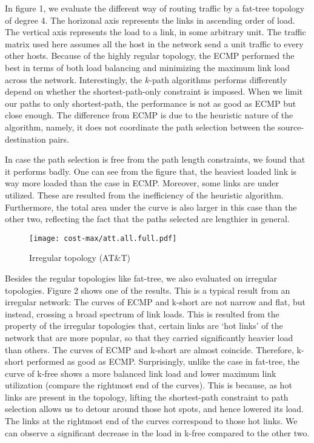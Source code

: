 \documentclass[conference]{IEEEtran}
\begin{document}
In figure 1, we evaluate the different way of routing traffic by a fat-tree
topology of degree 4. The horizonal axis represents the links in ascending
order of load. The vertical axis represents the load to a link, in some
arbitrary unit. The traffic matrix used here assumes all the host in the
network send a unit traffic to every other hosts. Because of the highly regular
topology, the ECMP performed the best in terms of both load balancing and
minimizing the maximum link load across the network. Interestingly, the
$k$-path algorithms performs differently depend on whether the
shortest-path-only constraint is imposed. When we limit our paths to only
shortest-path, the performance is not as good as ECMP but close enough. The
difference from ECMP is due to the heuristic nature of the algorithm, namely,
it does not coordinate the path selection between the source-destination pairs.

In case the path selection is free from the path length constraints, we found
that it performs badly. One can see from the figure that, the heaviest loaded
link is way more loaded than the case in ECMP. Moreover, some links are under
utilized. These are resulted from the inefficiency of the heuristic algorithm.
Furthermore, the total area under the curve is also larger in this case than
the other two, reflecting the fact that the paths selected are lengthier in
general.

\begin{figure}
\centering\texttt{[image: cost-max/att.all.full.pdf]}
\caption{Irregular topology (AT\&T)}
\end{figure}

Besides the regular topologies like fat-tree, we also evaluated on irregular
topologies. Figure 2 shows one of the results. This is a typical result from an
irregular network: The curves of ECMP and k-short are not narrow and flat, but
instead, crossing a broad spectrum of link loads. This is resulted from the
property of the irregular topologies that, certain links are `hot links' of the
network that are more popular, so that they carried significantly heavier load
than others. The curves of ECMP and k-short are almost coincide. Therefore,
k-short performed as good as ECMP. Surprisingly, unlike the case in fat-tree,
the curve of k-free shows a more balanced link load and lower maximum link
utilization (compare the rightmost end of the curves). This is because, as hot
links are present in the topology, lifting the shortest-path constraint to path
selection allows us to detour around those hot spots, and hence lowered its
load. The links at the rightmost end of the curves correspond to those hot
links. We can observe a significant decrease in the load in k-free compared to
the other two.
\end{document}
